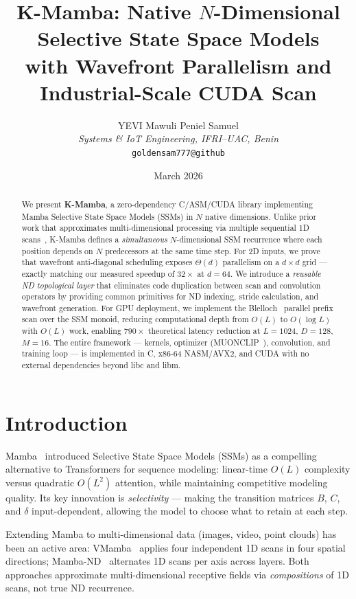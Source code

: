 \documentclass[10pt,onecolumn]{article}
\title{\textbf{K-Mamba: Native $N$-Dimensional Selective State Space Models\\
with Wavefront Parallelism and Industrial-Scale CUDA Scan}}
\author{
  YEVI Mawuli Peniel Samuel\\
  \textit{Systems \& IoT Engineering, IFRI--UAC, Benin}\\
  \texttt{goldensam777@github}
}
\date{March 2026}
\begin{document}
\maketitle

\begin{abstract}
We present \textbf{K-Mamba}, a zero-dependency C/ASM/CUDA library implementing
Mamba Selective State Space Models (SSMs) in $N$ native dimensions.
Unlike prior work that approximates multi-dimensional processing via multiple
sequential 1D scans~\cite{vmamba,mamband},
K-Mamba defines a \emph{simultaneous} $N$-dimensional SSM recurrence where
each position depends on $N$ predecessors at the same time step.
For 2D inputs, we prove that wavefront anti-diagonal scheduling exposes
$\Theta(d)$ parallelism on a $d \times d$ grid --- exactly matching our
measured speedup of $32\times$ at $d = 64$.
We introduce a \emph{reusable ND topological layer} that eliminates code
duplication between scan and convolution operators by providing common
primitives for ND indexing, stride calculation, and wavefront generation.
For GPU deployment, we implement the Blelloch~\cite{blelloch1990}
parallel prefix scan over the SSM monoid, reducing computational
depth from $O(L)$ to $O(\log L)$ with $O(L)$ work, enabling
$790\times$ theoretical latency reduction at $L = 1024$, $D = 128$, $M = 16$.
The entire framework --- kernels, optimizer (MUONCLIP~\cite{muon2025}),
convolution, and training loop --- is implemented in
C, x86-64 NASM/AVX2, and CUDA with no external dependencies beyond libc and libm.
\end{abstract}

\section{Introduction}

Mamba~\cite{mamba2023} introduced Selective State Space Models (SSMs) as a
compelling alternative to Transformers for sequence modeling: linear-time
$O(L)$ complexity versus quadratic $O(L^2)$ attention, while maintaining
competitive modeling quality.
Its key innovation is \emph{selectivity} — making the transition matrices
$B$, $C$, and $\delta$ input-dependent, allowing the model to choose what
to retain at each step.

Extending Mamba to multi-dimensional data (images, video, point clouds)
has been an active area:
VMamba~\cite{vmamba} applies four independent 1D scans in four spatial directions;
Mamba-ND~\cite{mamband} alternates 1D scans per axis across layers.
Both approaches approximate multi-dimensional receptive fields via
\emph{compositions} of 1D scans, not true ND recurrence.
\end{document}
